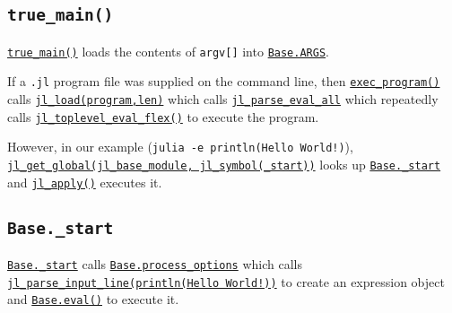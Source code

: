 \subsection{\texttt{true\_main()}}



\href{https://github.com/JuliaLang/julia/blob/master/ui/repl.c}{\texttt{true\_main()}} loads the contents of \texttt{argv[]} into \hyperlink{2567473177880607455}{\texttt{Base.ARGS}}.



If a \texttt{.jl} {\textquotedbl}program{\textquotedbl} file was supplied on the command line, then \href{https://github.com/JuliaLang/julia/blob/master/ui/repl.c}{\texttt{exec\_program()}} calls \href{https://github.com/JuliaLang/julia/blob/master/src/toplevel.c}{\texttt{jl\_load(program,len)}} which calls \href{https://github.com/JuliaLang/julia/blob/master/src/ast.c}{\texttt{jl\_parse\_eval\_all}} which repeatedly calls \href{https://github.com/JuliaLang/julia/blob/master/src/toplevel.c}{\texttt{jl\_toplevel\_eval\_flex()}} to execute the program.



However, in our example (\texttt{julia -e {\textquotesingle}println({\textquotedbl}Hello World!{\textquotedbl}){\textquotesingle}}), \href{https://github.com/JuliaLang/julia/blob/master/src/module.c}{\texttt{jl\_get\_global(jl\_base\_module, jl\_symbol({\textquotedbl}\_start{\textquotedbl}))}} looks up \href{https://github.com/JuliaLang/julia/blob/master/base/client.jl}{\texttt{Base.\_start}} and \href{https://github.com/JuliaLang/julia/blob/master/src/julia.h}{\texttt{jl\_apply()}} executes it.



\hypertarget{12561163861893339364}{}


\subsection{\texttt{Base.\_start}}



\href{https://github.com/JuliaLang/julia/blob/master/base/client.jl}{\texttt{Base.\_start}} calls \href{https://github.com/JuliaLang/julia/blob/master/base/client.jl}{\texttt{Base.process\_options}} which calls \href{https://github.com/JuliaLang/julia/blob/master/src/ast.c}{\texttt{jl\_parse\_input\_line({\textquotedbl}println({\textquotedbl}Hello World!{\textquotedbl}){\textquotedbl})}} to create an expression object and \hyperlink{7507639810592563424}{\texttt{Base.eval()}} to execute it.




